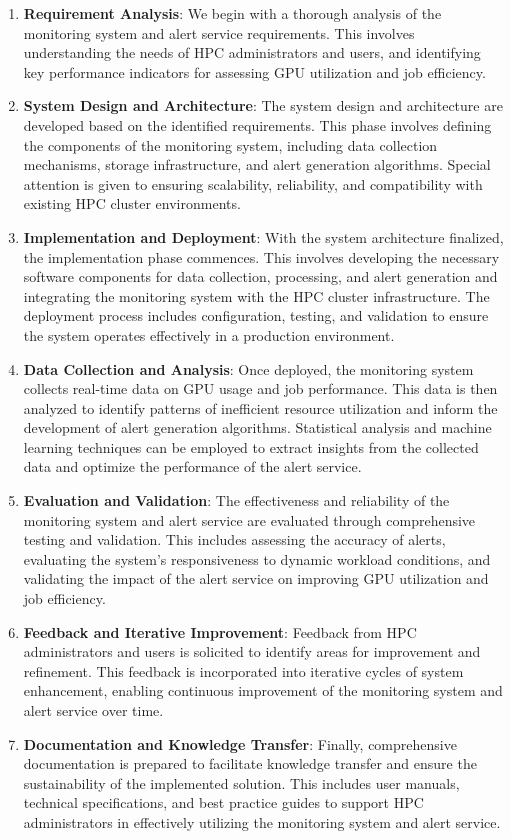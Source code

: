 \begin{enumerate}
    \item \textbf{Requirement Analysis}: We begin with a thorough analysis of the monitoring system and alert service requirements. This involves understanding the needs of HPC administrators and users, and identifying key performance indicators for assessing GPU utilization and job efficiency.
    \item \textbf{System Design and Architecture}: The system design and architecture are developed based on the identified requirements. This phase involves defining the components of the monitoring system, including data collection mechanisms, storage infrastructure, and alert generation algorithms. Special attention is given to ensuring scalability, reliability, and compatibility with existing HPC cluster environments.
    \item \textbf{Implementation and Deployment}: With the system architecture finalized, the implementation phase commences. This involves developing the necessary software components for data collection, processing, and alert generation and integrating the monitoring system with the HPC cluster infrastructure. The deployment process includes configuration, testing, and validation to ensure the system operates effectively in a production environment.
    \item \textbf{Data Collection and Analysis}: Once deployed, the monitoring system collects real-time data on GPU usage and job performance. This data is then analyzed to identify patterns of inefficient resource utilization and inform the development of alert generation algorithms. Statistical analysis and machine learning techniques can be employed to extract insights from the collected data and optimize the performance of the alert service.
    \item \textbf{Evaluation and Validation}: The effectiveness and reliability of the monitoring system and alert service are evaluated through comprehensive testing and validation. This includes assessing the accuracy of alerts, evaluating the system's responsiveness to dynamic workload conditions, and validating the impact of the alert service on improving GPU utilization and job efficiency.
    \item \textbf{Feedback and Iterative Improvement}: Feedback from HPC administrators and users is solicited to identify areas for improvement and refinement. This feedback is incorporated into iterative cycles of system enhancement, enabling continuous improvement of the monitoring system and alert service over time.
    \item \textbf{Documentation and Knowledge Transfer}: Finally, comprehensive documentation is prepared to facilitate knowledge transfer and ensure the sustainability of the implemented solution. This includes user manuals, technical specifications, and best practice guides to support HPC administrators in effectively utilizing the monitoring system and alert service.
\end{enumerate}

